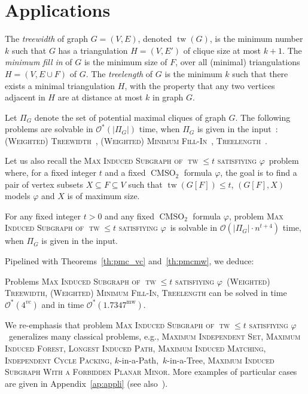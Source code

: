 \documentclass{llncs}
\newcommand{\cO}{\mathcal{O}}
\newcommand{\tw}{\operatorname{tw}}
\newcommand{\mw}{\operatorname{mw}}
\newcommand{\pmc}{potential maximal clique}
\newcommand{\cmsot}{\operatorname{CMSO}_2}
\newcommand{\pmcb}{1.7347}
\newcommand{\kip}{{\sc $k$-in-a-Path}}
\newcommand{\kit}{{\sc $k$-in-a-Tree}}
\newcommand{\msphit}{\textsc{Max\- Induced\- Subgraph\- of\- $\tw\leq t$\- satisfiying\- $\varphi$}}
\begin{document}
\section{Applications}\label{se:appli}

The \emph{treewidth} of graph $G=(V,E)$, denoted $\tw(G)$, is the minimum number $k$ such that $G$ has a triangulation $H=(V,E')$ of clique size at most $k+1$. The \emph{minimum fill in} of $G$ is the minimum size of $F$, over all (minimal) triangulations $H=(V, E \cup F)$ of $G$. The \emph{treelength} of $G$ is the minimum $k$ such that there exists a minimal triangulation $H$, with the property that any two vertices adjacent in $H$ are at distance at most $k$ in graph $G$. 

\begin{proposition}
Let $\Pi_G$ denote the set of \pmc s of graph $G$. The following problems are solvable in $\cO^*(|\Pi_G|)$ time, when $\Pi_G$ is given in the input~: \textsc{(Weighted) Treewidth}~{\cite{FKTV08,BoRo03}}, \textsc{(Weighted) Minimum Fill-In}~{\cite{FKTV08,Gysel13}},
\textsc{Treelength}~\cite{Lokshtanov10}.
\end{proposition}


Let us also recall the \msphit\ problem where, for a fixed integer $t$ and a fixed $\cmsot$ formula $\varphi$, the goal is to find a pair of vertex subsets $X \subseteq F \subseteq V$ such that $\tw(G[F]) \leq t$, $(G[F],X)$ models $\varphi$ and $X$ is of maximum size. 

\begin{proposition}\label{pr:msphit}
For any fixed integer $t>0$ and any fixed $\cmsot$ formula $\varphi$, problem  \msphit\ is solvable in $\cO(|\Pi_G| \cdot n^{t+4})$ time, when $\Pi_G$ is given in the input.
\end{proposition}



Pipelined with Theorems~\ref{th:pmc_vc} and~\ref{th:pmcmw}, we deduce:
\begin{theorem}\label{th:appli}
Problems  \msphit\ \textsc{(Weighted) Treewidth}, \textsc{(Weighted) Minimum Fill-In},  \textsc{Treelength} can be solved in time $\cO^*(4^{vc})$ and in time $\cO^*(\pmcb^{\mw})$.\\
\end{theorem}
We re-emphasis that problem \msphit\ generalizes many classical problems, e.g.,  \textsc{Maximum Independent Set},  \textsc{Maximum Induced Forest},  \textsc{Longest Induced Path}, \textsc{Maximum Induced Matching}, \textsc{Independent Cycle Packing},  \kip,\ \kit, \textsc{Maximum Induced Subgraph With a Forbidden Planar Minor}. More examples of particular cases are given in Appendix~\ref{ap:appli} (see also~\cite{FoToVi14}). 
\end{document}
